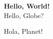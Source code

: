 \documentclass{article}
\begin{document}
\noindent
{\LARGE
\textbf {Hello, World!} \\
Hello, Globe?

Hola, Planet!
}
\end{document}
